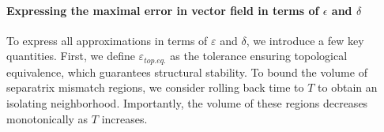 \documentclass{article}
\newcommand{\ascomment}[1]{\textcolor{ascolor}{(#1)}}
\newcommand{\vol}{\operatorname{vol}}
\newcounter{ct}
\begin{document}


\paragraph{Expressing the maximal error in vector field in terms of $\epsilon$ and $\delta$}  
To express all approximations in terms of $\varepsilon$ and $\delta$, we introduce a few key quantities. First, we define $\varepsilon_{top.eq.}$ as the tolerance ensuring topological equivalence, which guarantees structural stability.  
To bound the volume of separatrix mismatch regions, we consider rolling back time to $T$ to obtain an isolating neighborhood.
Importantly, the volume of these regions decreases monotonically as $T$ increases.
\end{document}
